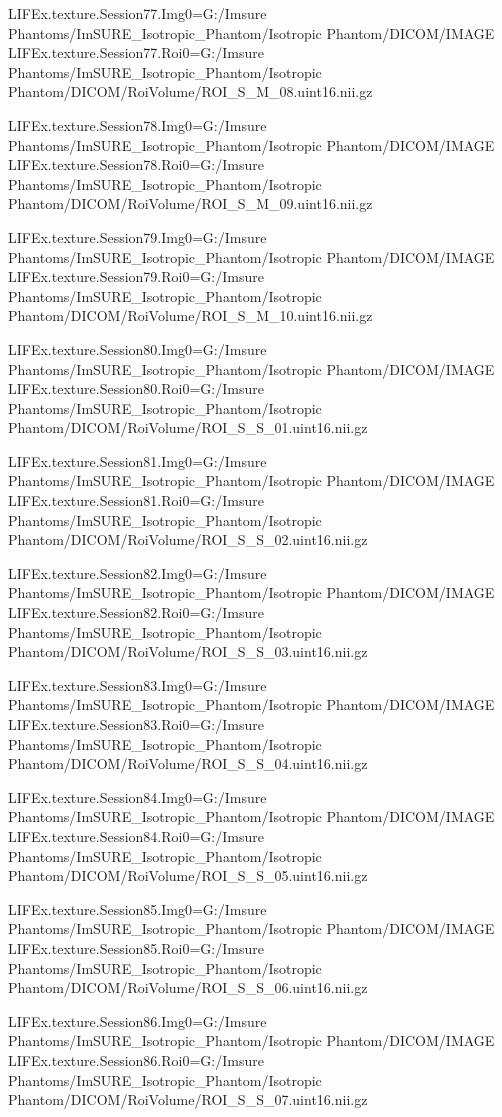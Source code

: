 LIFEx.texture.Session77.Img0=G:/Imsure Phantoms/ImSURE_Isotropic_Phantom/Isotropic Phantom/DICOM/IMAGE
LIFEx.texture.Session77.Roi0=G:/Imsure Phantoms/ImSURE_Isotropic_Phantom/Isotropic Phantom/DICOM/RoiVolume/ROI_S_M_08.uint16.nii.gz

LIFEx.texture.Session78.Img0=G:/Imsure Phantoms/ImSURE_Isotropic_Phantom/Isotropic Phantom/DICOM/IMAGE
LIFEx.texture.Session78.Roi0=G:/Imsure Phantoms/ImSURE_Isotropic_Phantom/Isotropic Phantom/DICOM/RoiVolume/ROI_S_M_09.uint16.nii.gz

LIFEx.texture.Session79.Img0=G:/Imsure Phantoms/ImSURE_Isotropic_Phantom/Isotropic Phantom/DICOM/IMAGE
LIFEx.texture.Session79.Roi0=G:/Imsure Phantoms/ImSURE_Isotropic_Phantom/Isotropic Phantom/DICOM/RoiVolume/ROI_S_M_10.uint16.nii.gz

LIFEx.texture.Session80.Img0=G:/Imsure Phantoms/ImSURE_Isotropic_Phantom/Isotropic Phantom/DICOM/IMAGE
LIFEx.texture.Session80.Roi0=G:/Imsure Phantoms/ImSURE_Isotropic_Phantom/Isotropic Phantom/DICOM/RoiVolume/ROI_S_S_01.uint16.nii.gz

LIFEx.texture.Session81.Img0=G:/Imsure Phantoms/ImSURE_Isotropic_Phantom/Isotropic Phantom/DICOM/IMAGE
LIFEx.texture.Session81.Roi0=G:/Imsure Phantoms/ImSURE_Isotropic_Phantom/Isotropic Phantom/DICOM/RoiVolume/ROI_S_S_02.uint16.nii.gz

LIFEx.texture.Session82.Img0=G:/Imsure Phantoms/ImSURE_Isotropic_Phantom/Isotropic Phantom/DICOM/IMAGE
LIFEx.texture.Session82.Roi0=G:/Imsure Phantoms/ImSURE_Isotropic_Phantom/Isotropic Phantom/DICOM/RoiVolume/ROI_S_S_03.uint16.nii.gz

LIFEx.texture.Session83.Img0=G:/Imsure Phantoms/ImSURE_Isotropic_Phantom/Isotropic Phantom/DICOM/IMAGE
LIFEx.texture.Session83.Roi0=G:/Imsure Phantoms/ImSURE_Isotropic_Phantom/Isotropic Phantom/DICOM/RoiVolume/ROI_S_S_04.uint16.nii.gz

LIFEx.texture.Session84.Img0=G:/Imsure Phantoms/ImSURE_Isotropic_Phantom/Isotropic Phantom/DICOM/IMAGE
LIFEx.texture.Session84.Roi0=G:/Imsure Phantoms/ImSURE_Isotropic_Phantom/Isotropic Phantom/DICOM/RoiVolume/ROI_S_S_05.uint16.nii.gz

LIFEx.texture.Session85.Img0=G:/Imsure Phantoms/ImSURE_Isotropic_Phantom/Isotropic Phantom/DICOM/IMAGE
LIFEx.texture.Session85.Roi0=G:/Imsure Phantoms/ImSURE_Isotropic_Phantom/Isotropic Phantom/DICOM/RoiVolume/ROI_S_S_06.uint16.nii.gz

LIFEx.texture.Session86.Img0=G:/Imsure Phantoms/ImSURE_Isotropic_Phantom/Isotropic Phantom/DICOM/IMAGE
LIFEx.texture.Session86.Roi0=G:/Imsure Phantoms/ImSURE_Isotropic_Phantom/Isotropic Phantom/DICOM/RoiVolume/ROI_S_S_07.uint16.nii.gz


